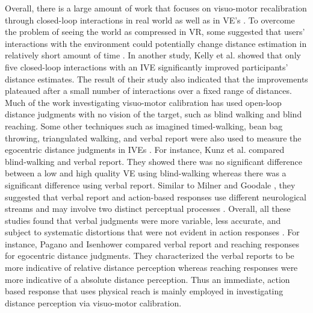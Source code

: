 Overall, there is a large amount of work that focuses on visuo-motor recalibration through closed-loop interactions in real world \cite{RPA+95,BP98} as well as in VE's \cite{MCT06,KCT13}. To overcome the problem of seeing the world as compressed in VR, some suggested that users' interactions with the environment could potentially change distance estimation in relatively short amount of time \cite{RW05,ANL+12,KHS+14,JSS+11}. In another study, Kelly et al. \cite{KHS+14} showed that only five closed-loop interactions with an IVE significantly improved participants' distance estimates. The result of their study also indicated that the improvements plateaued after a small number of interactions over a fixed range of distances. Much of the work investigating visuo-motor calibration has used open-loop distance judgments with no vision of the target, such as blind walking and blind reaching. Some other techniques such as imagined timed-walking, bean bag throwing, triangulated walking, and verbal report were also used to measure the egocentric distance judgments in IVEs \cite{RVH13}. For instance, Kunz et al. \cite{KWS+09} compared blind-walking and verbal report. They showed there was no significant difference between a low and high quality VE using blind-walking whereas there was a significant difference using verbal report. Similar to Milner and Goodale \cite{MG06}, they suggested that verbal report and action-based responses use different neurological streams and may involve two distinct perceptual processes \cite{NAB+11,PGJ01,FO77}. Overall, all these studies found that verbal judgments were more variable, less accurate, and subject to systematic distortions that were not evident in action responses \cite{PI08,PB98}. For instance, Pagano and Isenhower \cite{PI08} compared verbal report and reaching responses for egocentric distance judgments. They characterized the verbal reports to be more indicative of relative distance perception whereas reaching responses were more indicative of a absolute distance perception. Thus an immediate, action based response that uses physical reach is mainly employed in investigating distance perception via visuo-motor calibration.  

